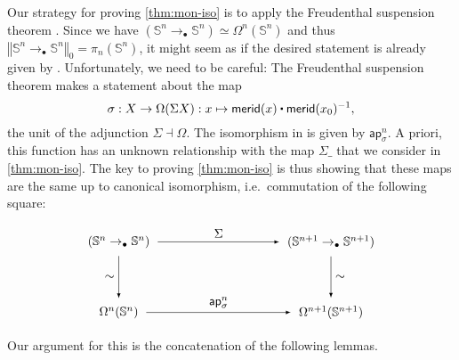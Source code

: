 \documentclass[11pt,a4paper,oneside,reqno]{amsart}
\theoremstyle{definition}
\theoremstyle{remark}
\newcommand{\sph}[1]{{\mathbb S}^{#1}}
\newcommand{\ct}{%
  \mathchoice{\mathbin{\raisebox{0.5ex}{$\displaystyle\centerdot$}}}%
             {\mathbin{\raisebox{0.5ex}{$\centerdot$}}}%
             {\mathbin{\raisebox{0.25ex}{$\scriptstyle\,\centerdot\,$}}}%
             {\mathbin{\raisebox{0.1ex}{$\scriptscriptstyle\,\centerdot\,$}}}
}
\newcommand{\trunc}[2]{\mathopen{}\left\Vert #2\right\Vert_{#1}\mathclose{}}
\newcommand{\pointedm}{\rightarrow_\bullet}
\begin{document}
Our strategy for proving \cref{thm:mon-iso} is to apply the
Freudenthal suspension theorem \cite[Thm 8.6.4]{HoTT}. 
Since we have $(\sph n \pointedm \sph n) \simeq \Omega^n(\sph n)$ and thus $\trunc 0 {\sph n \pointedm \sph n} = \pi_n(\sph n)$, it might seem as if 
the desired statement is already given by \cite[Cor 8.6.15]{HoTT}.
Unfortunately, we need to be careful: 
The Freudenthal suspension theorem makes a statement about the map
\begin{equation}
 \sigma : X \to \Omega(\Sigma X) : x \mapsto \mathsf{merid}(x) \ct \mathsf{merid}(x_0)^{-1},
\end{equation}
the unit of the adjunction $\Sigma \dashv \Omega$.
The isomorphism in \cite[Cor 8.6.15]{HoTT}
is given by $\mathsf{ap}^n_\sigma$.
A priori, this function has an unknown relationship with the map $\Sigma \_$ that we consider in \cref{thm:mon-iso}.
The key to proving \cref{thm:mon-iso} is thus showing that these maps are the same up to canonical isomorphism, i.e.\ commutation of the following square:

\begin{equation} \label{eq:needs-to-commute}
\begin{tikzpicture}[x=6cm,y=-2cm,baseline=(current bounding box.center)]
 \tikzset{arrow/.style={shorten >=0.1cm,shorten <=.1cm,-latex}}
 \node (A) at (0,0) {$(\sph n \pointedm \sph n)$}; 
 \node (B) at (0,1) {$\Omega^n(\sph n)$}; 
 \node (C) at (1,1) {$\Omega^{n+1}(\sph {n+1})$}; 
 \node (D) at (1,0) {$(\sph {n+1} \pointedm \sph {n+1})$}; 

 \draw[arrow] (A) to node [left] {$\sim$} (B);
 \draw[arrow] (B) to node [above] {$\mathsf{ap}^n_\sigma$} (C);
 \draw[arrow] (D) to node [right] {$\sim$} (C);
 \draw[arrow] (A) to node [above] {$\Sigma$} (D);
\end{tikzpicture}
\end{equation}

Our argument for this is the concatenation of the following lemmas.
\end{document}
